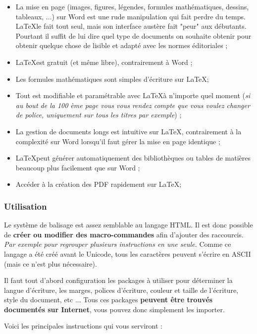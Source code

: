 \begin{itemize}
\item La mise en page (images, figures, légendes, formules mathématiques, dessins, tableaux, ...) sur Word est une rude manipulation
 qui fait perdre du temps. \LaTeX  le fait tout seul, mais son interface austère fait "peur" aux débutants.
  Pourtant il suffit de lui dire quel type de documents on souhaite obtenir pour obtenir quelque chose de lisible
  et adapté avec les normes éditoriales ;
\item \LaTeX  est gratuit (et même libre), contrairement à Word ;
\item Les formules mathématiques sont simples d'écriture sur \LaTeX  ;
\item Tout est modifiable et paramétrable avec \LaTeX  à n'importe quel moment
(\textit{si au bout de la 100 ème page vous vous rendez compte que vous voulez
changer de police, uniquement sur tous les titres par exemple}) ;
\item La gestion de documents longs est intuitive sur \LaTeX , contrairement à
la complexité sur Word lorsqu'il faut gérer
la mise en page identique ;
\item \LaTeX  peut générer automatiquement des bibliothèques ou tables de matières beaucoup plus facilement que sur Word ;
\item Accéder à la création des PDF rapidement sur \LaTeX  ;
\end{itemize}


\subsubsection{Utilisation}

Le système de balisage est assez semblable au langage HTML. Il est donc possible
de \textbf{créer ou modifier des macro-commandes} afin d'ajouter des raccourcis.
\textit{Par exemple pour regrouper plusieurs instructions en une seule.}
Comme ce langage a été créé avant le Unicode, tous les caractères peuvent
s'écrire en ASCII (mais ce n'est plus nécessaire).

Il faut tout d'abord configuration les packages à utiliser pour déterminer la
langue d’écriture, les marges, polices d’écriture, couleur et taille de
l’écriture, style du document, etc ...
Tous ces packages \textbf{peuvent être trouvés documentés sur Internet}, vous
pouvez donc simplement les importer.\newline

Voici les principales instructions qui vous serviront :

